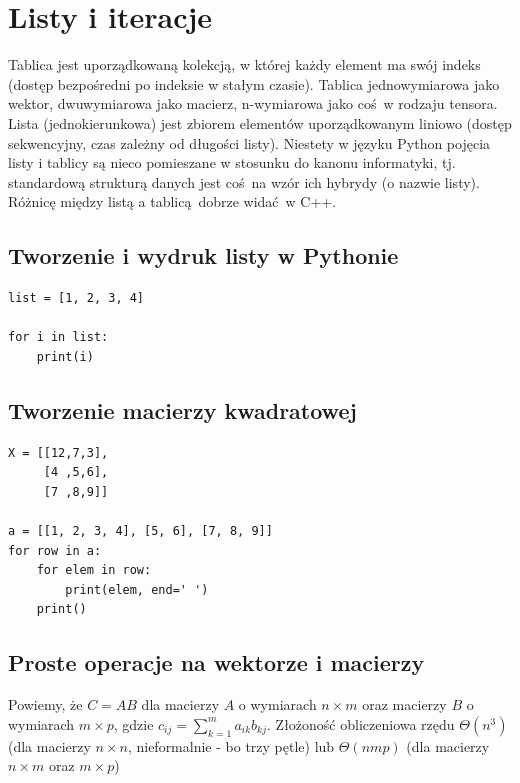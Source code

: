 \documentclass[10pt, oneside]{article}
\theoremstyle{remark}
\begin{document}

\section{Listy i iteracje}

Tablica jest uporządkowaną kolekcją, w której każdy element ma swój indeks (dostęp bezpośredni po indeksie w stałym czasie).
Tablica jednowymiarowa jako wektor, dwuwymiarowa jako macierz, n-wymiarowa jako coś w rodzaju tensora.
Lista (jednokierunkowa) jest zbiorem elementów uporządkowanym liniowo (dostęp sekwencyjny, czas zależny od długości listy).
Niestety w języku Python pojęcia listy i tablicy są nieco pomieszane w stosunku do kanonu informatyki, tj. standardową strukturą danych jest coś na wzór ich hybrydy (o nazwie listy).
Różnicę między listą a tablicą dobrze widać w C++.

\subsection{Tworzenie i wydruk listy w Pythonie}
\begin{verbatim}
list = [1, 2, 3, 4]

for i in list:
    print(i)

\end{verbatim}


\subsection{Tworzenie macierzy kwadratowej}
\begin{verbatim}
X = [[12,7,3],
     [4 ,5,6],
     [7 ,8,9]]
     
a = [[1, 2, 3, 4], [5, 6], [7, 8, 9]]
for row in a:
    for elem in row:
        print(elem, end=' ')
    print()
\end{verbatim}


\subsection{Proste operacje na wektorze i macierzy}
Powiemy, że $C =AB$ dla macierzy $A$ o wymiarach $n \times m$ oraz macierzy $B$ o wymiarach $m \times p$, gdzie $c_{{ij}}=\sum _{{k=1}}^{m}a_{{ik}}b_{{kj}}$.
Złożoność obliczeniowa rzędu $\Theta(n^3)$ (dla macierzy $n \times n$, nieformalnie - bo trzy pętle) lub $\Theta(nmp)$ (dla macierzy $n \times m$ oraz $m \times p$)
\end{document}
